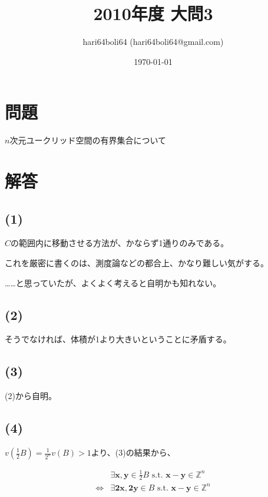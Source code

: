 \documentclass[a4paper, 10pt, dvipdfmx]{jlreq}
\begin{document}
\title{2010年度 大問3}
\author{hari64boli64 (hari64boli64@gmail.com)}
\date{\today}
\maketitle

\section{問題}

$n$次元ユークリッド空間の有界集合について

\section{解答}

\subsection*{(1)}

$C$の範囲内に移動させる方法が、かならず1通りのみである。

これを厳密に書くのは、測度論などの都合上、かなり難しい気がする。

……と思っていたが、よくよく考えると自明かも知れない。

\subsection*{(2)}

そうでなければ、体積が1より大きいということに矛盾する。

\subsection*{(3)}

(2)から自明。

\subsection*{(4)}

$v(\frac{1}{2}B)=\frac{1}{2^n}v(B) > 1$より、(3)の結果から、

\begin{align*}
                  & \exists \bm{x},\bm{y} \in \frac{1}{2}B \text{ s.t. } \bm{x}-\bm{y} \in \mathbb{Z}^n \\
  \Leftrightarrow & \exists \bm{2x},\bm{2y} \in B \text{ s.t. } \bm{x}-\bm{y} \in \mathbb{Z}^n
\end{align*}
\end{document}
